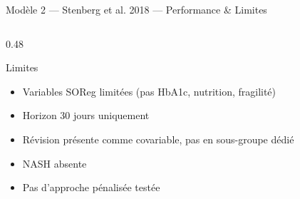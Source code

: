 \documentclass[aspectratio=169]{beamer}
\begin{document}
\begin{frame}[shrink=5]{Modèle 2 --- Stenberg et al. 2018 --- Performance \& Limites}
\begin{columns}[T]
\begin{column}{0.48\textwidth}
\begin{alertblock}{Limites}
\begin{itemize}
          \item Variables SOReg limitées (pas HbA1c, nutrition, fragilité)
          \item Horizon 30 jours uniquement
          \item Révision présente comme covariable, pas en sous-groupe dédié
          \item NASH absente
          \item Pas d'approche pénalisée testée
        \end{itemize}
      \end{alertblock}
    \end{column}
  \end{columns}
\end{frame}

\end{document}

